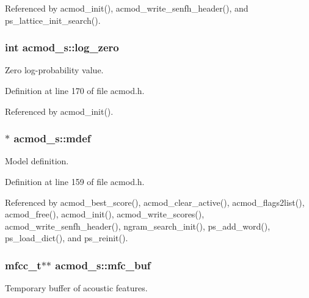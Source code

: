 Referenced by acmod\+\_\+init(), acmod\+\_\+write\+\_\+senfh\+\_\+header(), and ps\+\_\+lattice\+\_\+init\+\_\+search().

\subsubsection[{log\+\_\+zero}]{\setlength{\rightskip}{0pt plus 5cm}int acmod\+\_\+s\+::log\+\_\+zero}\label{structacmod__s_a95d5195647b6395d95433d45e3f74d51}


Zero log-\/probability value. 



Definition at line 170 of file acmod.\+h.



Referenced by acmod\+\_\+init().

\subsubsection[{mdef}]{$\ast$ acmod\+\_\+s\+::mdef}\label{structacmod__s_a351548ff5547c29b4a684e10434a51dd}


Model definition. 



Definition at line 159 of file acmod.\+h.



Referenced by acmod\+\_\+best\+\_\+score(), acmod\+\_\+clear\+\_\+active(), acmod\+\_\+flags2list(), acmod\+\_\+free(), acmod\+\_\+init(), acmod\+\_\+write\+\_\+scores(), acmod\+\_\+write\+\_\+senfh\+\_\+header(), ngram\+\_\+search\+\_\+init(), ps\+\_\+add\+\_\+word(), ps\+\_\+load\+\_\+dict(), and ps\+\_\+reinit().

\subsubsection[{mfc\+\_\+buf}]{\setlength{\rightskip}{0pt plus 5cm}mfcc\+\_\+t$\ast$$\ast$ acmod\+\_\+s\+::mfc\+\_\+buf}\label{structacmod__s_a5ded3dce0428a6ecba97b5d3486e7fa9}


Temporary buffer of acoustic features. 



